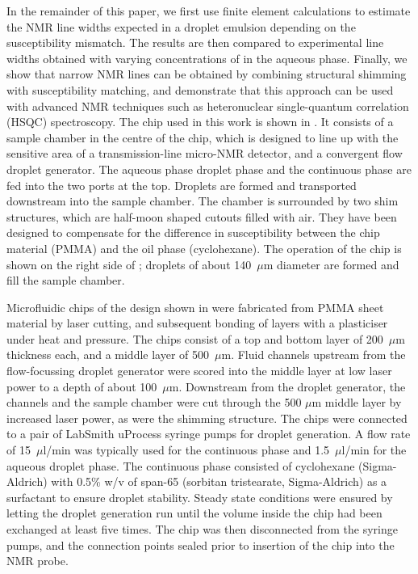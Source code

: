 In the remainder of this paper, we first use
finite element calculations to estimate
the NMR line widths expected in a droplet emulsion
depending on the susceptibility mismatch.
The results are then compared to experimental
line widths obtained with varying concentrations
of  in the aqueous phase. Finally,
we show that narrow NMR lines
can be obtained by
combining structural shimming \cite{Ryan:2014hl} with
susceptibility matching, and demonstrate that this
approach can be used with advanced
NMR techniques such as heteronuclear
single-quantum correlation (HSQC) spectroscopy.
The chip used in this work is shown in . It consists of a sample
chamber in the centre of the chip, which is designed to line up with
the sensitive area of a transmission-line
micro-NMR detector,\cite{Finch:2016gv} and a convergent flow droplet
generator. The aqueous phase droplet phase and the continuous
phase are fed into the two ports at the top. Droplets are
formed and transported downstream into the sample chamber.
 The chamber is surrounded by two shim structures, which are half-moon
 shaped cutouts filled with air. They have been designed to compensate
 for the difference in susceptibility between the chip material (PMMA)
 and the oil phase (cyclohexane). The operation of the chip is shown
 on the right side of ; droplets of about 140~$\mu$m diameter are formed and
 fill the sample chamber.


Microfluidic chips of the design shown in 
were fabricated from PMMA sheet material by
laser cutting, and subsequent bonding of layers with a plasticiser
under heat and pressure.\cite{Yilmaz:2016fx} The chips consist of a
top and bottom layer of 200~$\mu$m thickness each, and a middle layer of
500~$\mu$m. Fluid channels upstream from the flow-focussing droplet
generator were scored into the middle layer at low laser power to a depth
of about 100~$\mu$m. Downstream from the droplet generator, the channels and
the sample chamber were cut through the 500 $\mu$m middle layer by increased
laser power, as were the shimming structure. The chips were connected to
a pair of LabSmith uProcess syringe pumps for droplet generation.
A flow rate of 15~$\mu$l/min was typically used for the continuous
phase and 1.5~$\mu$l/min for the aqueous droplet phase.
The continuous phase consisted of cyclohexane (Sigma-Aldrich)
with 0.5\% w/v of span-65 (sorbitan
tristearate, Sigma-Aldrich) as a surfactant to ensure droplet stability.
Steady state conditions were ensured by letting the droplet generation run until
the volume inside the chip had been exchanged at least five times. The
chip was then disconnected from the syringe pumps, and the connection
points sealed prior to insertion of the chip into the NMR probe.

